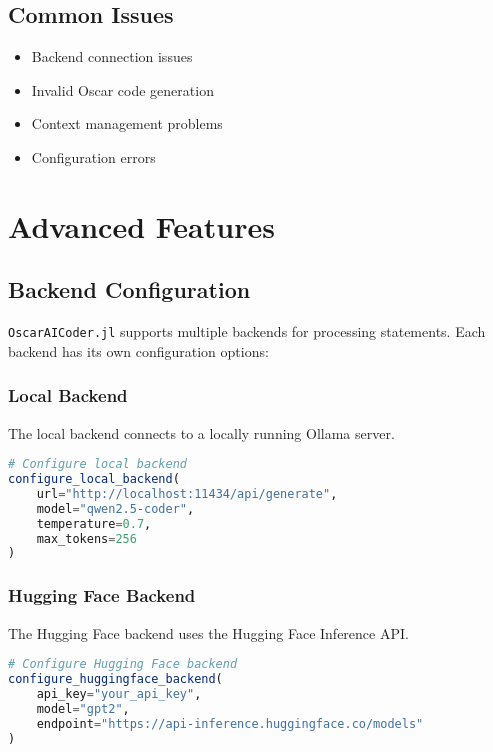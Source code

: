 \documentclass[11pt,a4paper]{article}
\newcommand{\modname}[1]{\texttt{#1}}
\begin{document}
\subsection{Common Issues}
\begin{itemize}
    \item Backend connection issues
    \item Invalid Oscar code generation
    \item Context management problems
    \item Configuration errors
\end{itemize}

\printindex

\section{Advanced Features}
\label{sec:advanced-features}

\subsection{Backend Configuration}
\label{subsec:backend_config}

\modname{OscarAICoder.jl} supports multiple backends for processing statements. Each backend has its own configuration options:

\subsubsection{Local Backend}
The local backend connects to a locally running Ollama server.

\begin{lstlisting}[language=Julia]
# Configure local backend
configure_local_backend(
    url="http://localhost:11434/api/generate",
    model="qwen2.5-coder",
    temperature=0.7,
    max_tokens=256
)
\end{lstlisting}

\subsubsection{Hugging Face Backend}
The Hugging Face backend uses the Hugging Face Inference API.

\begin{lstlisting}[language=Julia]
# Configure Hugging Face backend
configure_huggingface_backend(
    api_key="your_api_key",
    model="gpt2",
    endpoint="https://api-inference.huggingface.co/models"
)
\end{lstlisting}
\end{document}
